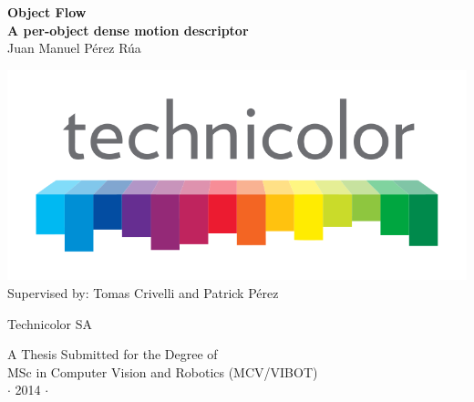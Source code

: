 
\newpage
\thispagestyle{empty}


\vspace*{1cm}
\begin{center}
{\huge\bf Object Flow\\}
{\large\bf A per-object dense motion descriptor\\}
\vspace{2cm} 
{\large Juan Manuel P\'erez R\'ua\\}
\vspace{1cm} 

\includegraphics[height=0.185\textheight]{images/logo/technicolor_large.png} \\

\vspace{1cm}
Supervised by: Tomas Crivelli and Patrick P\'erez

\vspace{1cm} 
\normalsize{Technicolor SA \\}%
\end{center}

\vspace{3cm}
\begin{center}
{\large A Thesis Submitted for the Degree of \\MSc in Computer Vision and Robotics (MCV/VIBOT) \\\vspace{0.3cm} $\cdot$ 2014
$\cdot$}
\end{center}
\singlespacing
